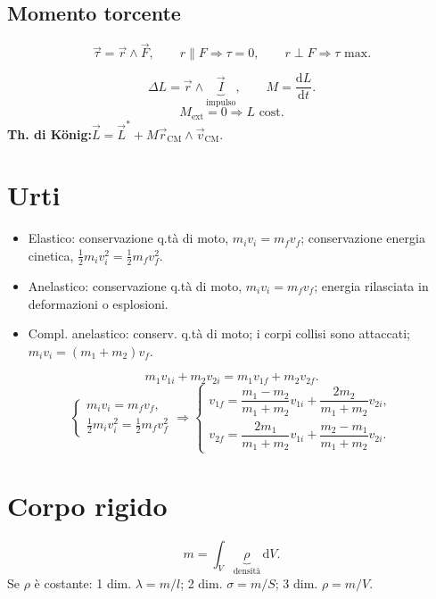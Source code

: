 \documentclass[a4paper,11pt]{article}
\newcommand{\orig}[1]{\clearpage}
\newcommand{\vv}[1]{\vec{#1}}
\newcommand{\dd}{\mathrm{d}}
\begin{document}
\subsection*{Momento torcente}
\[\vv\tau=\vv r\wedge\vv F,\qquad r\parallel F\Rightarrow\tau=0,\qquad r\perp F\Rightarrow\tau\text{ max}.\]
\begin{center}\end{center}
\[\Delta L=\vv r\wedge\underbrace{\vv I}_{\text{impulso}},\qquad M=\frac{\dd L}{\dd t}.\]
\[M_{\mathrm{ext}}=0\Rightarrow L\text{ cost.}\]
\textbf{Th. di König:}\quad $\vv L=\vv L^{*}+M\vv r_{\mathrm{CM}}\wedge\vv v_{\mathrm{CM}}$.
\orig{6}\section*{Urti}
\begin{itemize}
\item Elastico: conservazione q.tà di moto, $m_iv_i=m_fv_f$; conservazione energia cinetica, $\tfrac12m_iv_i^2=\tfrac12m_fv_f^2$.
\item Anelastico: conservazione q.tà di moto, $m_iv_i=m_fv_f$; energia rilasciata in deformazioni o esplosioni.
\item Compl. anelastico: conserv. q.tà di moto; i corpi collisi sono attaccati; $m_iv_i=(m_1+m_2)v_f$.
\end{itemize}
\[m_1v_{1i}+m_2v_{2i}=m_1v_{1f}+m_2v_{2f}.\]
\[\begin{cases}m_iv_i=m_fv_f,\\\tfrac12m_iv_i^2=\tfrac12m_fv_f^2\end{cases}\Rightarrow
\begin{cases}v_{1f}=\dfrac{m_1-m_2}{m_1+m_2}v_{1i}+\dfrac{2m_2}{m_1+m_2}v_{2i},\\[6pt]
v_{2f}=\dfrac{2m_1}{m_1+m_2}v_{1i}+\dfrac{m_2-m_1}{m_1+m_2}v_{2i}.\end{cases}\]
\section*{Corpo rigido}
\[m=\int_V\underbrace\rho_{\text{densità}}\,\dd V.\]
Se $\rho$ è costante: 1 dim. $\lambda=m/l$; 2 dim. $\sigma=m/S$; 3 dim. $\rho=m/V$.
\end{document}
